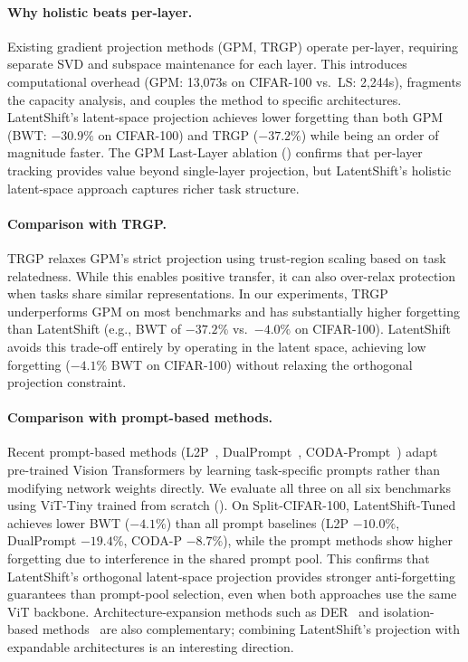 \documentclass{article}
\begin{document}
\paragraph{Why holistic beats per-layer.}
Existing gradient projection methods (GPM, TRGP) operate per-layer, requiring
separate SVD and subspace maintenance for each layer. This introduces
computational overhead (GPM: 13,073s on CIFAR-100 vs.\ LS: 2,244s), fragments
the capacity analysis, and couples the method to specific architectures.
LatentShift's latent-space projection achieves lower forgetting than both GPM
(BWT: $-30.9\%$ on CIFAR-100) and TRGP ($-37.2\%$) while being an order of magnitude
faster. The GPM Last-Layer ablation () confirms that
per-layer tracking provides value beyond single-layer projection, but
LatentShift's holistic latent-space approach captures richer task structure.

\paragraph{Comparison with TRGP.}
TRGP relaxes GPM's strict projection using trust-region scaling based on
task relatedness. While this enables positive transfer, it can also
over-relax protection when tasks share similar representations.
In our experiments, TRGP underperforms GPM on most benchmarks and has
substantially higher forgetting than LatentShift (e.g., BWT of $-37.2\%$ vs.\
$-4.0\%$ on CIFAR-100). LatentShift avoids this trade-off entirely by
operating in the latent space, achieving low
forgetting ($-4.1\%$ BWT on CIFAR-100) without relaxing the orthogonal
projection constraint.

\paragraph{Comparison with prompt-based methods.}
Recent prompt-based methods (L2P~\citep{wang2022learning},
DualPrompt~\citep{wang2022dualprompt}, CODA-Prompt~\citep{smith2023coda})
adapt pre-trained Vision Transformers by learning task-specific prompts
rather than modifying network weights directly.
We evaluate all three on all six benchmarks using ViT-Tiny trained from scratch
(\Cref{tab:summary,tab:vit}).
On Split-CIFAR-100, LatentShift-Tuned achieves lower BWT ($-4.1\%$) than all
prompt baselines (L2P $-10.0\%$, DualPrompt $-19.4\%$, CODA-P $-8.7\%$),
while the prompt methods show higher forgetting due to interference in the
shared prompt pool.
This confirms that LatentShift's orthogonal latent-space projection provides
stronger anti-forgetting guarantees than prompt-pool selection, even when both
approaches use the same ViT backbone.
Architecture-expansion methods such as
DER~\citep{yan2021dynamically} and
isolation-based methods~\citep{wang2023isolation} are also complementary;
combining LatentShift's projection with expandable architectures is an
interesting direction.
\end{document}
